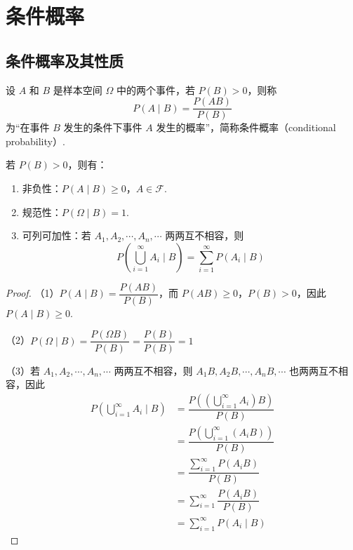 \section{条件概率}

\subsection{条件概率及其性质}

\begin{definition}
    \indent 设 $A$ 和 $B$ 是样本空间 $\varOmega$ 中的两个事件，若 $P(B)>0$，则称
    $$
    P(A \mid B) = \dfrac{P(AB)}{P(B)}
    $$
    为“在事件 $B$ 发生的条件下事件 $A$ 发生的概率”，简称{\heiti 条件概率}（conditional probability）.
\end{definition}

\begin{property}
    \indent 若 $P(B) > 0$，则有：
    \begin{enumerate}
        \item 非负性：$P(A \mid B) \geqslant 0$，$A \in \mathcal{F}$.
        \item 规范性：$P(\varOmega \mid B) = 1$.
        \item 可列可加性：若 $A_1, A_2, \cdots, A_n, \cdots$ 两两互不相容，则
        $$
        P \left( \bigcup_{i=1}^{\infty} A_i \mid B \right) = \sum_{i=1}^{\infty} P(A_i \mid B)
        $$
    \end{enumerate}
\end{property}

\begin{proof}
    （1）$P(A \mid B) = \dfrac{P(AB)}{P(B)}$，而 $P(AB) \geqslant 0$，$P(B)>0$，因此 $P(A \mid B) \geqslant 0$.

    （2）$P(\varOmega \mid B) = \dfrac{P(\varOmega B)}{P(B)} = \dfrac{P(B)}{P(B)} = 1$

    （3）若 $A_1, A_2, \cdots, A_n, \cdots$ 两两互不相容，则 $A_1 B, A_2 B, \cdots, A_n B, \cdots$ 也两两互不相容，因此
    $$
    \begin{aligned}
        P \left( \bigcup_{i=1}^{\infty} A_i \mid B \right) &= \dfrac{P \left( \left( \displaystyle\bigcup_{i=1}^{\infty} A_i \right) B \right)}{P(B)} \\
        &= \dfrac{P \left( \displaystyle\bigcup_{i=1}^{\infty} (A_i B) \right)}{P(B)} \\
        &= \dfrac{\displaystyle\sum_{i=1}^{\infty} P(A_i B)}{P(B)} \\
        &= \sum_{i=1}^{\infty} \dfrac{P(A_i B)}{P(B)} \\
        &= \sum_{i=1}^{\infty} P(A_i \mid B)
    \end{aligned}
    $$
\end{proof}

